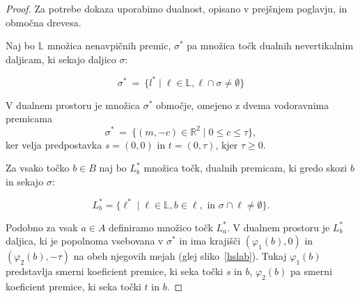 \documentclass[a4paper, 12pt]{book}
\newcommand{\LL}{\ensuremath{\mathbb L}}
\newcommand{\RR}{\ensuremath{\mathbb R}}  %
\begin{document}
\begin{proof}
Za potrebe dokaza uporabimo dualnost, opisano v prejšnjem poglavju, in območna drevesa.

Naj bo $\LL$ množica nenavpičnih premic, $\sigma^*$ pa množica točk dualnih nevertikalnim daljicam, ki sekajo daljico $\sigma$:

\[
		\sigma^* ~=~ \{ l^* \mid \ell\in \LL, \ell\cap \sigma\neq \emptyset\} 
\]

V dualnem prostoru je množica $\sigma^*$ območje, omejeno z dvema vodoravnima premicama
\[
		\sigma^* ~=~ \{ (m,-c)\in \RR^2\mid 0\le c\le \tau\},
\]
ker velja predpostavka $s=(0,0)$ in $t=(0,\tau)$, kjer $\tau\ge 0$.


Za vsako točko $b\in B$ naj bo $L^* _b$ množica točk, dualnih premicam, ki gredo skozi $b$ in sekajo $\sigma$:

\[
		L^*_b=\{ \ell^* \mid \ell\in \LL, b \in \ell, \text{ in } \sigma\cap \ell\not= \emptyset\}.
	\]

Podobno za vsak $a\in A$ definiramo množico točk $L^* _a$. V dualnem prostoru je $L^* _b$ daljica, ki je popolnoma vsebovana v $\sigma^*$ in ima krajišči $(\varphi_1(b),0)$ in $(\varphi_2(b),-\tau)$ na obeh njegovih mejah (glej sliko~\ref{hslab}). Tukaj $\varphi_1(b)$ predstavlja smerni koeficient premice, ki seka točki $s$ in $b$, $\varphi_2(b)$ pa smerni koeficient premice, ki seka točki $t$ in $b$.


\end{proof}
\end{document}
